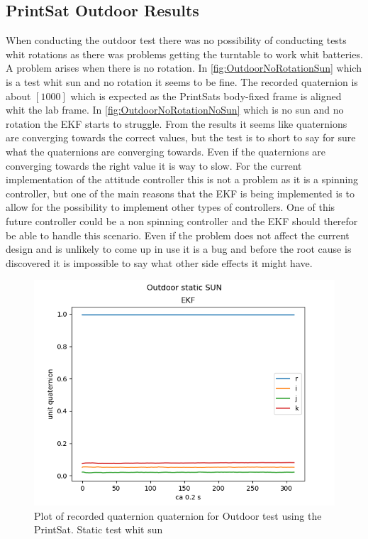 \subsection{PrintSat Outdoor Results}
When conducting the outdoor test there was no possibility of conducting tests whit rotations as there was problems getting the turntable to work whit batteries. A problem arises when there is no rotation. In \autoref{fig:OutdoorNoRotationSun} which is a test whit sun and no rotation it seems to be fine. The recorded quaternion is about $[1 0 0 0]$ which is expected as the PrintSats body-fixed frame is aligned whit the lab frame. In \autoref{fig:OutdoorNoRotationNoSun} which is no sun and no rotation the EKF starts to struggle. From the results it seems like quaternions are converging towards the correct values, but the test is to short to say for sure what the quaternions are converging towards. Even if the quaternions are converging towards the right value it is way to slow. For the current implementation of the attitude controller this is not a  problem as it is a spinning controller, but one of the main reasons that the EKF is being implemented is to allow for the possibility to implement other types of controllers. One of this future controller could be a non spinning controller and the EKF should therefor be able to handle this scenario. Even if the problem does not affect the current design and is unlikely to come up in use it is a bug and before the root cause is discovered it is impossible to say what other side effects it might have.

\begin{figure}[tbp]
	\centering
	\includegraphics[width=0.6\columnwidth]{./Pictures/run3OutdoorStaticSUN}
	\caption{Plot of recorded quaternion quaternion for Outdoor test using the PrintSat. Static test whit sun}
	\label{fig:OutdoorNoRotationSun}
\end{figure}

